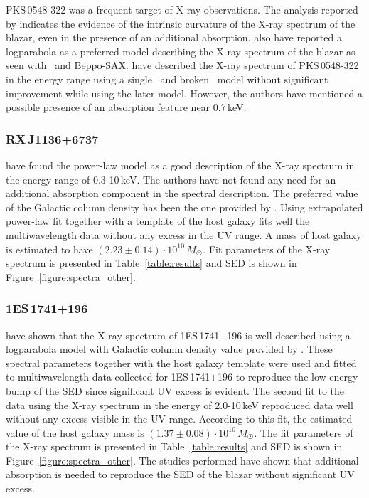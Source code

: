 PKS\,0548-322 was a frequent target of X-ray observations. 
The analysis reported by \cite{Costamante_0548} indicates the evidence of the intrinsic curvature of the X-ray spectrum of the blazar, even in the presence of an additional absorption. 
\cite{Perri_0548} also have reported a logparabola as a preferred model describing the X-ray spectrum of the blazar as seen with \xrt\ and Beppo-SAX.
\cite{hess_0548} have described the X-ray spectrum of PKS\,0548-322 in the energy range using a single \po\ and broken \po\ model without significant improvement while using the later model. However, the authors have mentioned a possible presence of an absorption feature near 0.7\,keV.




\subsubsection*{RX\,J1136+6737}
\cite{Wierzcholska2016} have found the power-law model as a good description of the X-ray spectrum in the energy range of 0.3-10\,keV. The authors have not  found any need for an additional absorption component in the spectral description. The preferred value of the Galactic column density has been the one provided by  \cite{Willingale13}.
Using extrapolated power-law fit together with a template of the host galaxy fits well the multiwavelength data without any excess in the UV range.  
A mass of host galaxy is estimated to have $(2.23 \pm 0.14)\cdot 10^{10}\,M_{\astrosun}$.
Fit parameters of the X-ray spectrum is presented in Table~\ref{table:results} and SED is shown in Figure~\ref{figure:spectra_other}.



\subsubsection*{1ES\,1741+196}
\cite{Wierzcholska2016} have shown that the X-ray spectrum of 1ES\,1741+196 is well described using a logparabola model with Galactic column density value provided by \cite{Willingale13}.
These spectral parameters together with the host galaxy template  were used and fitted to multiwavelength data collected for 1ES\,1741+196 to reproduce the low energy bump of the SED since significant UV excess is evident. 
The second fit to the data using the X-ray spectrum in the energy of 2.0-10\,keV reproduced data well without any excess visible in the UV range. 
According to this fit, the estimated value of the host galaxy mass is  $(1.37 \pm 0.08)\cdot 10^{10} \,M_{\astrosun}$.
The fit parameters of the X-ray spectrum is presented in Table~\ref{table:results} and SED is shown in Figure~\ref{figure:spectra_other}.
The studies performed have shown that additional absorption is needed to reproduce the SED of the blazar without significant UV excess. 

